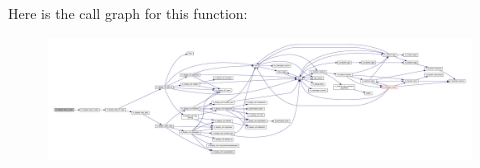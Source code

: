 Here is the call graph for this function\+:
\nopagebreak
\begin{figure}[H]
\begin{center}
\leavevmode
\includegraphics[width=350pt]{namespacem__display_a610ad67c4cfcad91bb6281b2c7ac3e07_cgraph}
\end{center}
\end{figure}
\mbox{\label{namespacem__display_a7a66451f6a0931ee7552ee4d8918ac20}} 
